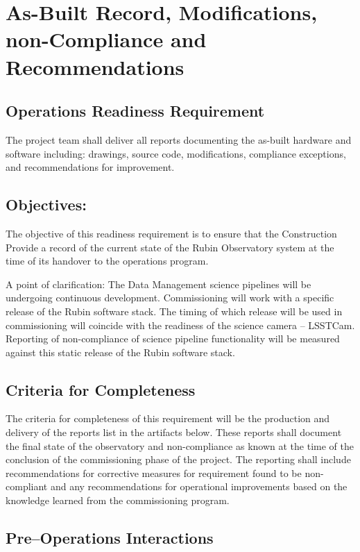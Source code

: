 \section{As-Built Record, Modifications, non-Compliance and Recommendations} \label{sec:recs}

\subsection{Operations Readiness Requirement}
The project team shall deliver all reports documenting the as-built hardware and software including: drawings, source code, modifications, compliance exceptions, and recommendations for improvement.

\subsection{Objectives:}

The objective of this readiness requirement is to ensure that the Construction Provide a record of the current state of the Rubin Observatory system at the time of its handover to the operations program.

A point of clarification: The Data Management science pipelines will be undergoing continuous development.  Commissioning will work with a specific release of the Rubin software stack.  The timing of which release will be used in commissioning will coincide with the readiness of the science camera -- LSSTCam.  Reporting of non-compliance of science pipeline functionality will be measured against this static release of the Rubin software stack.

\subsection{Criteria for Completeness}

The criteria for completeness of this requirement will be the production and delivery of the reports list in the artifacts below.  These reports shall document the final state of the observatory and non-compliance as known at the time of the conclusion of the commissioning phase of the project.  The reporting shall include recommendations for corrective measures for requirement found to be non-compliant and any recommendations for operational improvements based on the knowledge learned from the commissioning program.

\subsection{Pre--Operations Interactions}

